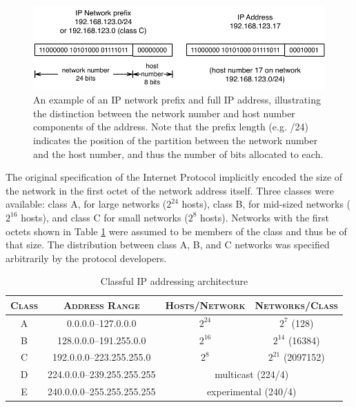 \begin{figure}[h]
\begin{centering}
    \includegraphics[width=6in]{static_figures/prefix_address.pdf}
    \caption[An example of an IP network prefix and a full IP address]{An
    example of an IP network prefix and full IP address, illustrating the
    distinction between the network number and host number components of the
    address. Note that the prefix length (e.g. /24) indicates the position of
    the partition between the network number and the host number, and thus the
    number of bits allocated to each.}
    \label{fig:ip_prefix_address}
\end{centering}
\end{figure}

The original specification of the Internet Protocol implicitly encoded the size
of the network in the first octet of the network address itself. Three classes
were available: class A, for large networks ($2^{24}$ hosts), class B, for
mid-sized networks ($2^{16}$ hosts), and class C for small networks ($2^{8}$
hosts).  Networks with the first octets shown in Table \ref{tab:addressing}
were assumed to be members of the class and thus be of that size. The
distribution between class A, B, and C networks was specified arbitrarily by
the protocol developers.

\begin{table}[h]
\begin{centering}
\begin{singlespace}
\small
\begin{tabular}{ c | c | c | c }
    \textsc{Class} & \textsc{Address Range} &
    \textsc{Hosts/Network} & \textsc{Networks/Class} \\
    \hline
	A & 0.0.0.0--127.0.0.0         & $2^{24}$ & $2^{7}$ (128)              \\
	B & 128.0.0.0--191.255.0.0     & $2^{16}$ & $2^{14}$ (16384)           \\
	C & 192.0.0.0--223.255.255.0   & $2^{8}$  & $2^{21}$ (2097152)         \\
	D & 224.0.0.0--239.255.255.255 & \multicolumn{2}{c}{multicast (224/4)} \\
	E & 240.0.0.0--255.255.255.255 & \multicolumn{2}{c}{experimental (240/4)}
\end{tabular}
\end{singlespace}
\end{centering}
\caption[Classful IP addressing architecture]{Classful IP addressing
architecture \cite{rfc791}}
\label{tab:addressing}
\end{table}

